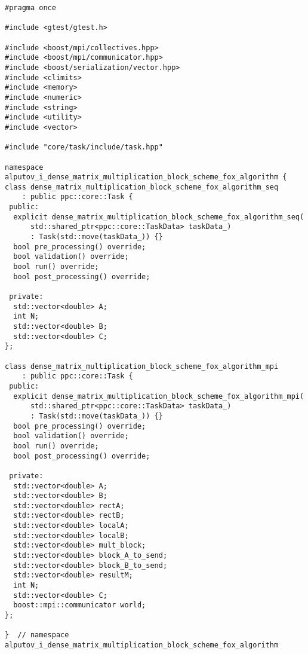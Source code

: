 \documentclass{report}
\begin{document}
\begin{lstlisting}[caption={opsmpi.hpp},label=lst:opsmpi1]
#pragma once

#include <gtest/gtest.h>

#include <boost/mpi/collectives.hpp>
#include <boost/mpi/communicator.hpp>
#include <boost/serialization/vector.hpp>
#include <climits>
#include <memory>
#include <numeric>
#include <string>
#include <utility>
#include <vector>

#include "core/task/include/task.hpp"

namespace alputov_i_dense_matrix_multiplication_block_scheme_fox_algorithm {
class dense_matrix_multiplication_block_scheme_fox_algorithm_seq
    : public ppc::core::Task {
 public:
  explicit dense_matrix_multiplication_block_scheme_fox_algorithm_seq(
      std::shared_ptr<ppc::core::TaskData> taskData_)
      : Task(std::move(taskData_)) {}
  bool pre_processing() override;
  bool validation() override;
  bool run() override;
  bool post_processing() override;

 private:
  std::vector<double> A;
  int N;
  std::vector<double> B;
  std::vector<double> C;
};

class dense_matrix_multiplication_block_scheme_fox_algorithm_mpi
    : public ppc::core::Task {
 public:
  explicit dense_matrix_multiplication_block_scheme_fox_algorithm_mpi(
      std::shared_ptr<ppc::core::TaskData> taskData_)
      : Task(std::move(taskData_)) {}
  bool pre_processing() override;
  bool validation() override;
  bool run() override;
  bool post_processing() override;

 private:
  std::vector<double> A;
  std::vector<double> B;
  std::vector<double> rectA;
  std::vector<double> rectB;
  std::vector<double> localA;
  std::vector<double> localB;
  std::vector<double> mult_block;
  std::vector<double> block_A_to_send;
  std::vector<double> block_B_to_send;
  std::vector<double> resultM;
  int N;
  std::vector<double> C;
  boost::mpi::communicator world;
};

}  // namespace alputov_i_dense_matrix_multiplication_block_scheme_fox_algorithm
\end{lstlisting}
\end{document}
